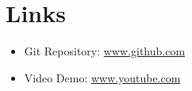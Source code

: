 


\maketitle
\newpage
{}



\section{Links}

\begin{itemize}
    \item Git Repository: \href{https://github.com/SerhiiYahdzhyiev/software-and-ai-project}{www.github.com}
    \item Video Demo: \href{https://www.youtube.com}{www.youtube.com}
\end{itemize}






\newpage
\printbibliography


